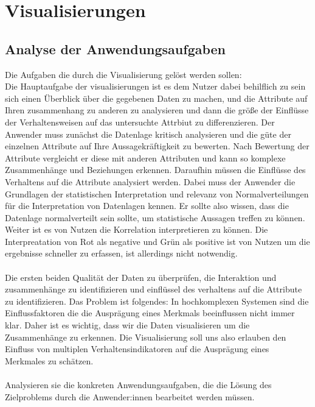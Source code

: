 \documentclass[usegeometry=true]{scrartcl}
\begin{document}
   

\section{Visualisierungen}
\subsection{Analyse der Anwendungsaufgaben}
Die Aufgaben die durch die Visualisierung gelöst werden sollen: \\ 
 Die Hauptaufgabe der visualisierungen ist es dem Nutzer dabei behilflich zu sein sich 
einen Überblick über die gegebenen Daten zu machen, und die Attribute auf Ihren zusammenhang zu anderen
zu analysieren und dann die größe der Einflüsse der Verhaltensweisen auf das untersuchte Attrbiut zu differenzieren. 
Der Anwender muss zunächst die Datenlage kritisch analysieren und die güte der einzelnen Attribute auf Ihre Aussagekräftigkeit zu bewerten. 
Nach Bewertung der Attribute vergleicht er diese mit anderen Attributen und kann so komplexe Zusammenhänge und Beziehungen erkennen. 
Daraufhin müssen die Einflüsse des Verhaltens auf die Attribute analysiert werden.
Dabei muss der Anwender die Grundlagen der statistischen Interpretation und relevanz
von Normalverteilungen für die Interpretation von Datenlagen kennen. Er sollte also wissen, dass die Datenlage normalverteilt sein sollte, um statistische Aussagen treffen zu können.
Weiter ist es von Nutzen die Korrelation interpretieren zu können. 
Die Interpreatation von Rot als negative und Grün als positive ist von Nutzen um die ergebnisse schneller zu erfassen, ist allerdings nicht notwendig.
\\
\\
Die ersten beiden Qualität der Daten zu überprüfen, die Interaktion und zusammenhänge zu identifizieren und einflüssel des verhaltens auf die Attribute zu identifizieren. 
Das Problem ist folgendes: In hochkomplexen Systemen sind die Einflussfaktoren
 die die Ausprägung eines Merkmals beeinflussen nicht immer klar. Daher ist es wichtig, 
 dass wir die Daten visualisieren um die Zusammenhänge zu erkennen.
Die Visualisierung soll uns also erlauben den Einfluss von multiplen Verhaltensindikatoren auf die Ausprägung eines Merkmales zu schätzen.
\\
\\
Analysieren sie die konkreten Anwendungsaufgaben, die die Lösung des Zielproblems durch die Anwender:innen bearbeitet werden müssen. 
\end{document}
